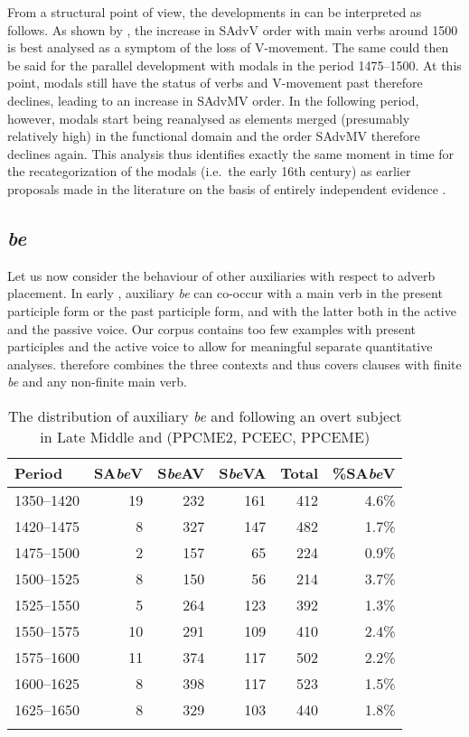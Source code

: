 \documentclass[output=paper]{langsci/langscibook}
\begin{document}
From a structural point of view, the developments in  can be
interpreted as follows. As shown by \citet{HaeIhs2016}, the increase in SAdvV
order with main verbs around 1500 is best analysed as a symptom of the loss of
V-movement. The same could then be said for the parallel development with
modals in the period 1475--1500. At this point, modals still have the status of
verbs and V-movement past  therefore declines, leading to an increase in
{SAdvMV} order. In the following period, however, modals start being reanalysed
as elements merged (presumably relatively high) in the functional domain and
the order SAdvMV therefore declines again. This analysis thus identifies
exactly the same moment in time for the recategorization of the modals (i.e.\
the early 16th century) as earlier proposals made in the literature on the
basis of entirely independent evidence \parencites[cf.\
e.g.][110]{Lightfoot1979}[31]{Lightfoot2006b}[310f.]{Roberts1993}.
%

\subsection{\emph{be}}

Let us now consider the behaviour of other auxiliaries with respect to adverb
placement. In early , auxiliary \emph{be} can co-occur with a main
verb in the present participle form or the past participle form, and with the
latter both in the active and the passive voice. Our corpus contains too few
examples with present participles and the active voice to allow for meaningful
separate quantitative analyses. \Cref{tab:key:09.2} therefore combines the three
contexts and thus covers clauses with finite \emph{be} and any non-finite
main verb.

\begin{table}
\caption{The distribution of auxiliary \emph{be} and  following an
overt subject in Late Middle and  (PPCME2, PCEEC, PPCEME)}%
\label{tab:key:09.2}
\begin{tabular}{lrrrrr}
\lsptoprule
{Period} & {SA\emph{be}V} & {S\emph{be}AV} & {S\emph{be}VA} & {Total} & {\%SA\emph{be}V}\\
\midrule
1350--1420 & 19 & 232 & 161 & 412 & 4.6\%\\
1420--1475 & 8 & 327 & 147 & 482 & 1.7\%\\
1475--1500 & 2 & 157 & 65 & 224 & 0.9\%\\
1500--1525 & 8 & 150 & 56 & 214 & 3.7\%\\
1525--1550 & 5 & 264 & 123 & 392 & 1.3\%\\
1550--1575 & 10 & 291 & 109 & 410 & 2.4\%\\
1575--1600 & 11 & 374 & 117 & 502 & 2.2\%\\
1600--1625 & 8 & 398 & 117 & 523 & 1.5\%\\
1625--1650 & 8 & 329 & 103 & 440 & 1.8\%\\
\lspbottomrule
\end{tabular}
\end{table}
\end{document}
